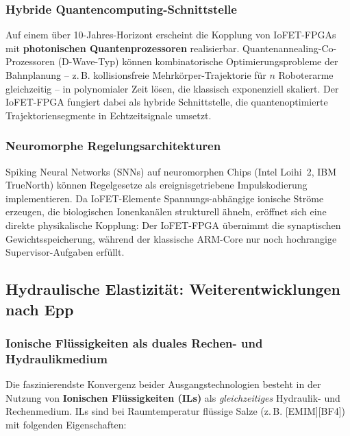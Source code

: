 ﻿\documentclass[a4paper,12pt]{scrreprt}
\theoremstyle{definition}
\begin{document}
\subsubsection{Hybride Quantencomputing-Schnittstelle}

Auf einem über 10-Jahres-Horizont erscheint die Kopplung von
IoFET-FPGAs mit \textbf{photonischen Quantenprozessoren} realisierbar.
Quantenannealing-Co-Prozessoren (D-Wave-Typ) können kombinatorische
Optimierungsprobleme der Bahn\-planung -- z.\,B. kollisionsfreie
Mehrkörper-Trajektorie für $n$ Roboterarme gleichzeitig --
in polynomialer Zeit lösen, die klassisch exponenziell skaliert.
Der IoFET-FPGA fungiert dabei als hybride Schnittstelle, die
quantenoptimierte Trajektoriensegmente in Echtzeitsignale umsetzt.

\subsubsection{Neuromorphe Regelungsarchitekturen}

Spiking Neural Networks (SNNs) auf neuromorphen Chips
(Intel Loihi~2, IBM TrueNorth) können Regelgesetze als
ereignisgetriebene Impulskodierung implementieren.
Da IoFET-Elemente Spannungs-abhängige ionische Ströme erzeugen,
die biologischen Ionenkanälen strukturell ähneln, eröffnet
sich eine direkte physikalische Kopplung: Der IoFET-FPGA
übernimmt die synaptischen Gewichtsspeicherung, während
der klassische ARM-Core nur noch hochrangige Supervisor-Aufgaben erfüllt.

\subsection{Hydraulische Elastizität: Weiterentwicklungen nach Epp}

\subsubsection{Ionische Flüssigkeiten als duales Rechen- und Hydraulikmedium}

Die faszinierendste Konvergenz beider Ausgangstechnologien besteht in
der Nutzung von \textbf{Ionischen Flüssigkeiten (ILs)} als \emph{gleichzeitiges}
Hydraulik- und Rechenmedium. ILs sind bei Raumtemperatur flüssige
Salze (z.\,B. \mbox{[EMIM][BF4]}) mit folgenden Eigenschaften:
\end{document}
